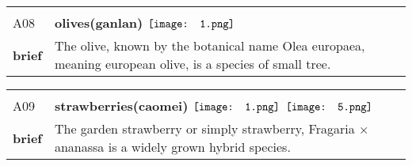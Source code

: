 \documentclass[UTF8]{article}
\begin{document}
            \begin{tabularx}{\textwidth}{p{1.5cm}X}
            \arrayrulecolor{myBlue}
        	\hline\\
            \small{A08}&
            \large{\bfseries{olives(ganlan)}}\hfill
                                                            $\vcenter{\hbox{\texttt{[image: 1.png]}}}$
                                                                \phantom{$\vcenter{\hbox{\texttt{[image: 2.png]}}}$}
                                                                \phantom{$\vcenter{\hbox{\texttt{[image: 3.png]}}}$}
                                                                \phantom{$\vcenter{\hbox{\texttt{[image: 4.png]}}}$}
                                                                \phantom{$\vcenter{\hbox{\texttt{[image: 5.png]}}}$}
                                                                \phantom{$\vcenter{\hbox{\texttt{[image: 6.png]}}}$}
                                                                \phantom{$\vcenter{\hbox{\texttt{[image: 7.png]}}}$}
                                        \\[10pt]
            \large{\bfseries{brief}}&\noindent\parbox[c]{\hsize}{The olive, known by the botanical name Olea europaea, meaning european olive, is a species of small tree.} \\[5pt]
            \hline\\[-10pt]
        \end{tabularx}
            \begin{tabularx}{\textwidth}{p{1.5cm}X}
            \arrayrulecolor{myBlue}
        	\hline\\
            \small{A09}&
            \large{\bfseries{strawberries(caomei)}}\hfill
                                                            $\vcenter{\hbox{\texttt{[image: 1.png]}}}$
                                                                \phantom{$\vcenter{\hbox{\texttt{[image: 2.png]}}}$}
                                                                \phantom{$\vcenter{\hbox{\texttt{[image: 3.png]}}}$}
                                                                \phantom{$\vcenter{\hbox{\texttt{[image: 4.png]}}}$}
                                                                $\vcenter{\hbox{\texttt{[image: 5.png]}}}$
                                                                \phantom{$\vcenter{\hbox{\texttt{[image: 6.png]}}}$}
                                                                \phantom{$\vcenter{\hbox{\texttt{[image: 7.png]}}}$}
                                        \\[10pt]
            \large{\bfseries{brief}}&\noindent\parbox[c]{\hsize}{The garden strawberry or simply strawberry, Fragaria × ananassa is a widely grown hybrid species.} \\[5pt]
            \hline\\[-10pt]
        \end{tabularx}
\end{document}
